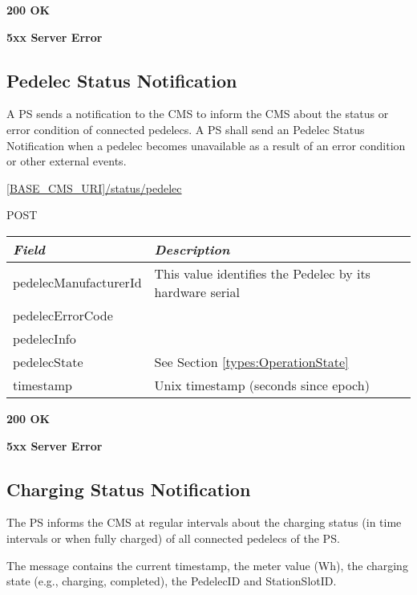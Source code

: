  \textbf{200 OK}

 \textbf{5xx Server Error}

\subsection{Pedelec Status Notification}

A \acs{PS} sends a notification to the \acs{CMS} to inform the \acs{CMS} about the status or error condition of connected pedelecs. A \acs{PS} shall send an Pedelec Status Notification when a pedelec becomes unavailable as a result of an error condition or other external events.

 \url{[BASE_CMS_URI]/status/pedelec}

 POST

\begin{table}[!h]
\vspace{-7mm}
\begin{tabularx}{\linewidth}{ | l | X | }
  \hline
  \textit{Field} & \textit{Description} \\
  \hline \hline
  pedelecManufacturerId 		& This value identifies the Pedelec by its hardware serial\\
  pedelecErrorCode & \\
  pedelecInfo & \\
  pedelecState & See Section \ref{types:OperationState} \\
  timestamp & Unix timestamp (seconds since epoch) \\
  \hline
\end{tabularx}
\end{table}

 \textbf{200 OK}

 \textbf{5xx Server Error}


\subsection{Charging Status Notification}
\label{ps:charging-status}

The \acs{PS} informs the \acs{CMS} at regular intervals about the charging status (in time intervals or when fully charged) of all connected pedelecs of the \acs{PS}.

The message contains the current timestamp, the meter value (Wh), the charging state (e.g., charging, completed), the PedelecID and StationSlotID.

